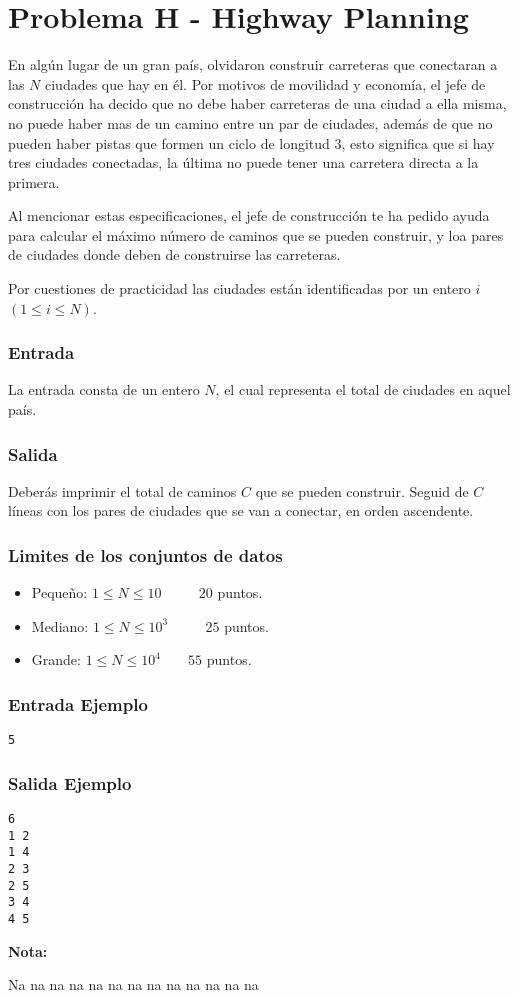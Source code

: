 \chapter*{Problema H - Highway Planning}


En algún lugar de un gran país, olvidaron construir carreteras que conectaran a las $N$ ciudades que hay en él. 
Por motivos de movilidad y economía, el jefe de construcción ha decido que no debe haber carreteras de una ciudad a ella misma, no puede haber mas de un camino entre un par de ciudades,  
además de que no pueden haber pistas que formen un ciclo de longitud $3$, esto significa que si hay tres ciudades conectadas, la última no puede tener una carretera directa a la primera. 

Al mencionar estas especificaciones, el jefe de construcción te ha pedido ayuda para calcular el máximo número de caminos que se pueden construir, y loa pares de ciudades donde deben de construirse las carreteras. 

Por cuestiones de practicidad las ciudades están identificadas por un entero $i$ $(1 \leq i \leq N)$.

\subsection*{Entrada}

La entrada consta de un entero $N$, el cual representa el total de ciudades en aquel país.

\subsection*{Salida}

Deberás imprimir el total de caminos $C$ que se pueden construir. Seguid de $C$ líneas con los pares de ciudades que se van a conectar, en orden ascendente.

\subsection*{Limites de los conjuntos de datos}
\begin{itemize}
    \item Pequeño: $ 1\leq N \leq 10 $ $\quad \quad $ $20$ puntos.
    \item Mediano: $ 1\leq N \leq 10^3 $ $\quad \quad$ $25$ puntos.
    \item Grande: $1 \leq N \leq 10^{4} $ $\quad \;$ $55$ puntos.
\end{itemize}

\begin{multicols}{2}
\subsection*{Entrada Ejemplo}
\begin{verbatim}
5
\end{verbatim}
\columnbreak
\subsection*{Salida Ejemplo}
\begin{verbatim}
6
1 2
1 4
2 3
2 5
3 4
4 5
\end{verbatim}
\end{multicols}

\textbf{Nota:}

Na na na na na na na na na na na na na
